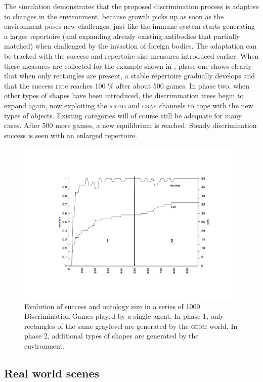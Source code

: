 The simulation demonstrates
that the proposed discrimination process is adaptive to
changes in the environment, because growth picks up
as soon as the environment poses new challenges, just 
like the immune system starts generating a larger 
repertoire (and expanding already existing antibodies
that partially matched)
when challenged by the invastion of foreign bodies. 
The adaptation can be tracked with the success and 
repertoire size measures introduced earlier. 
When these measures are collected for the example shown in 
, phase one shows clearly that 
when only rectangles are present, a stable 
repertoire gradually develops and that the success rate reaches 100 \%
after about 500 games. In phase two, when other types of 
shapes have been introduced,
the discrimination trees begin to expand again, now exploiting the
\textsc{ratio} and \textsc{gray} channels to cope with the new types of objects.
Existing categories will of course still be adequate for 
many cases. After 500 more games, a new equilibrium
is reached. Steady discrimination success is seen with an 
enlarged repertoire.

\begin{figure}[htbp]
  \centerline{\includegraphics[width=\textwidth]{chap4/figs/adptwrlglo.pdf}}
\caption{\label{adptwrlglo}Evolution of success and ontology
size in a series of 1000 Discrimination Games played by a single agent.
In phase 1, only rectangles of the same graylevel are 
generated by the \textsc{geom} world. In phase 2, additional types of 
shapes are generated by the environment.}
\end{figure}

\subsection{Real world scenes}


